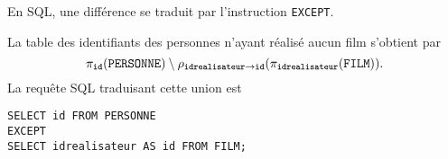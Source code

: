 En SQL, une différence se traduit par l'instruction \texttt{EXCEPT}.
\begin{exemple}
La table des identifiants des personnes n'ayant réalisé aucun film s'obtient par 
\begin{equation*}
  \pi_{\mathtt{id}}(\mathtt{PERSONNE})\setminus \rho_{\mathtt{idrealisateur}\rightarrow\mathtt{id}}(\pi_{\mathtt{idrealisateur}}(\mathtt{FILM})).
\end{equation*}
La requête SQL traduisant cette union est 
\begin{verbatim}
SELECT id FROM PERSONNE
EXCEPT
SELECT idrealisateur AS id FROM FILM;
\end{verbatim}
\end{exemple}

%
%
%
%
%
%
